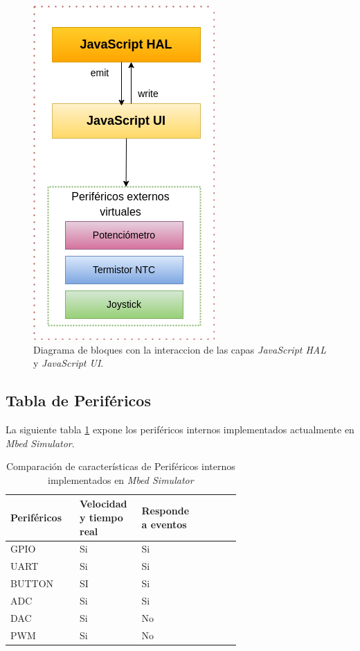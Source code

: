 \begin{figure}[ht]
	\centering
	\includegraphics[scale=.57]{./Figures/uiADC.png}
	\caption{Diagrama de bloques con la interaccion de las capas  \textit{JavaScript HAL} y \textit{JavaScript UI}.}
	\label{fig:uiADC}
\end{figure}


\subsection{Tabla de Periféricos}

La siguiente tabla \ref{tab:perifericosInternosMBED} expone los  periféricos internos implementados actualmente en \textit{Mbed Simulator}.

\begin{table}[h]
\centering
\caption[Comparación de características de periféricos internos implementados en \textit{Mbed Simulator}]{Comparación de características de Periféricos internos implementados en \textit{Mbed Simulator}}
\begin{tabular}{p{0.24\linewidth} p{0.14\linewidth}  p{0.14\linewidth}  p{0.14\linewidth}}
\toprule
\textbf{Periféricos} 
& \textbf{Velocidad y tiempo real}
& \textbf{Responde a eventos}
\\
\midrule
GPIO & Si & Si  \\
UART & Si & Si \\
BUTTON & SI & Si \\
ADC & Si & Si \\
DAC & Si & No \\
PWM & Si & No \\ 
\bottomrule
\hline
\end{tabular}
\label{tab:perifericosInternosMBED}
\end{table}


